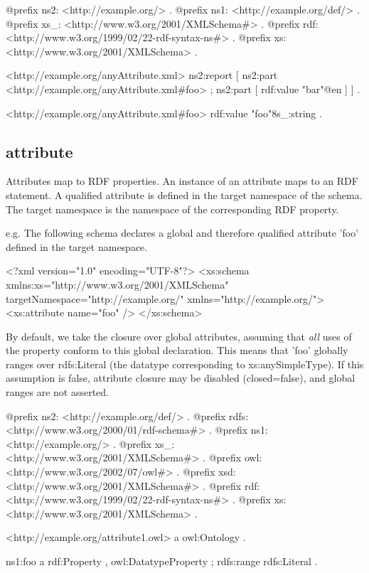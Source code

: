 \begin{DoxyCodeInclude}
@prefix ns2:     <http://example.org/> .
@prefix ns1:     <http://example.org/def/> .
@prefix xs_:     <http://www.w3.org/2001/XMLSchema#> .
@prefix rdf:     <http://www.w3.org/1999/02/22-rdf-syntax-ns#> .
@prefix xs:      <http://www.w3.org/2001/XMLSchema> .

<http://example.org/anyAttribute.xml>
      ns2:report
              [ ns2:part <http://example.org/anyAttribute.xml#foo> ;
                ns2:part
                        [ rdf:value "bar"@en
                        ]
              ] .

<http://example.org/anyAttribute.xml#foo>
      rdf:value "foo"^^xs_:string .
\end{DoxyCodeInclude}
 \hypertarget{attribute}{}\subsection{attribute}\label{attribute}
Attributes map to RDF properties. An instance of an attribute maps to an RDF statement. A qualified attribute is defined in the target namespace of the schema. The target namespace is the namespace of the corresponding RDF property.

e.g. The following schema declares a global and therefore qualified attribute 'foo' defined in the target namespace.


\begin{DoxyCodeInclude}
<?xml version="1.0" encoding="UTF-8"?>
<xs:schema xmlns:xs="http://www.w3.org/2001/XMLSchema" 
        targetNamespace="http://example.org/" xmlns="http://example.org/">
        <xs:attribute name="foo" />
</xs:schema>
\end{DoxyCodeInclude}


By default, we take the closure over global attributes, assuming that {\itshape all\/} uses of the property conform to this global declaration. This means that 'foo' globally ranges over rdfs:Literal (the datatype corresponding to xs:anySimpleType). If this assumption is false, attribute closure may be disabled (closed=false), and global ranges are not asserted.


\begin{DoxyCodeInclude}
@prefix ns2:     <http://example.org/def/> .
@prefix rdfs:    <http://www.w3.org/2000/01/rdf-schema#> .
@prefix ns1:     <http://example.org/> .
@prefix xs_:     <http://www.w3.org/2001/XMLSchema#> .
@prefix owl:     <http://www.w3.org/2002/07/owl#> .
@prefix xsd:     <http://www.w3.org/2001/XMLSchema#> .
@prefix rdf:     <http://www.w3.org/1999/02/22-rdf-syntax-ns#> .
@prefix xs:      <http://www.w3.org/2001/XMLSchema> .

<http://example.org/attribute1.owl>
      a       owl:Ontology .

ns1:foo
      a       rdf:Property , owl:DatatypeProperty ;
      rdfs:range rdfs:Literal .
\end{DoxyCodeInclude}



